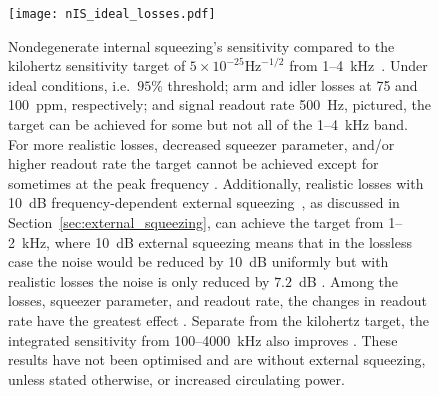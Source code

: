 \begin{figure}
    \centering
    \texttt{[image: nIS\_ideal\_losses.pdf]}
    \caption{  Nondegenerate internal squeezing's sensitivity compared to the kilohertz sensitivity target of $5\times10^{-25}\text{Hz}^{-1/2}$ from 1--4~kHz~\cite{Miao2018}. Under ideal conditions, i.e.\ $95\%$ threshold; arm and idler losses at 75 and 100~ppm, respectively; and signal readout rate 500~Hz, pictured, the target can be achieved for some but not all of the 1--4~kHz band. For more realistic losses, decreased squeezer parameter, and/or higher readout rate the target cannot be achieved except for sometimes at the peak frequency . Additionally, realistic losses with 10~dB frequency-dependent external squeezing~\cite{}, as discussed in Section~\ref{sec:external_squeezing}, can achieve the target from 1--2~kHz, where 10~dB external squeezing means that in the lossless case the noise would be reduced by 10~dB uniformly but with realistic losses the noise is only reduced by $7.2$~dB . Among the losses, squeezer parameter, and readout rate, the changes in readout rate have the greatest effect . %
    Separate from the kilohertz target, the integrated sensitivity from 100--4000~kHz also improves . These results have not been optimised and are without external squeezing, unless stated otherwise, or increased circulating power.}
    \label{fig:nIS_sens_target}
\end{figure}

